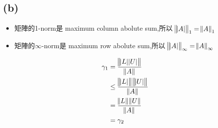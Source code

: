 \documentclass[12pt]{article}
\begin{document}
    \subsection*{(b)}
        \begin{itemize}
            \item 矩陣的1-norm是 maximum column abolute sum,所以 $\norm{\abs{A}}_1 = \norm{A}_1$
            \item 矩陣的$\infty$-norm是 maximum row abolute sum,所以 $\norm{\abs{A}}_\infty = \norm{A}_\infty$
        \end{itemize}
        \begin{equation*}
            \begin{aligned}
                \gamma_1 &= \frac{\norm{\abs{L}\abs{U}}}{\norm{A}}\\
                         &\leq \frac{\norm{\abs{L}}\norm{\abs{U}}}{\norm{A}}\\
                         &= \frac{\norm{L}\norm{U}}{\norm{A}}\\
                         &= \gamma_2\\
            \end{aligned}
        \end{equation*}
\end{document}
